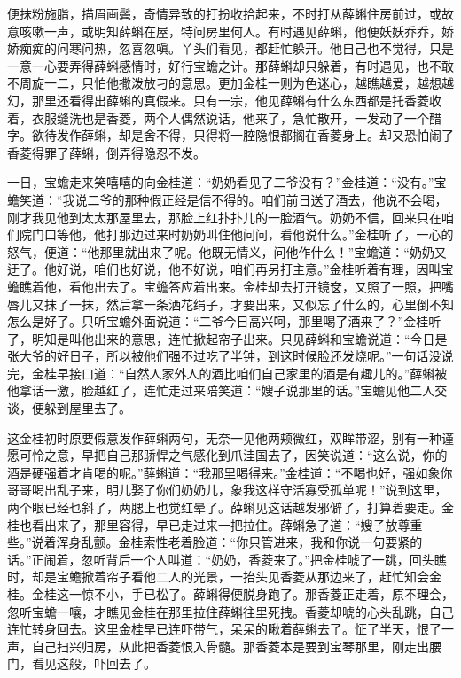 \begin{parag}
便抹粉施脂，描眉画鬓，奇情异致的打扮收拾起来，不时打从薛蝌住房前过，或故意咳嗽一声，或明知薛蝌在屋，特问房里何人。有时遇见薛蝌，他便妖妖乔乔，娇娇痴痴的问寒问热，忽喜忽嗔。丫头们看见，都赶忙躲开。他自己也不觉得，只是一意一心要弄得薛蝌感情时，好行宝蟾之计。那薛蝌却只躲着，有时遇见，也不敢不周旋一二，只怕他撒泼放刁的意思。更加金桂一则为色迷心，越瞧越爱，越想越幻，那里还看得出薛蝌的真假来。只有一宗，他见薛蝌有什么东西都是托香菱收着，衣服缝洗也是香菱，两个人偶然说话，他来了，急忙散开，一发动了一个醋字。欲待发作薛蝌，却是舍不得，只得将一腔隐恨都搁在香菱身上。却又恐怕闹了香菱得罪了薛蝌，倒弄得隐忍不发。
\end{parag}


\begin{parag}
    一日，宝蟾走来笑嘻嘻的向金桂道：“奶奶看见了二爷没有？”金桂道：“没有。”宝蟾笑道：“我说二爷的那种假正经是信不得的。咱们前日送了酒去，他说不会喝，刚才我见他到太太那屋里去，那脸上红扑扑儿的一脸酒气。奶奶不信，回来只在咱们院门口等他，他打那边过来时奶奶叫住他问问，看他说什么。”金桂听了，一心的怒气，便道：“他那里就出来了呢。他既无情义，问他作什么！”宝蟾道：“奶奶又迂了。他好说，咱们也好说，他不好说，咱们再另打主意。”金桂听着有理，因叫宝蟾瞧着他，看他出去了。宝蟾答应着出来。金桂却去打开镜奁，又照了一照，把嘴唇儿又抹了一抹，然后拿一条洒花绢子，才要出来，又似忘了什么的，心里倒不知怎么是好了。只听宝蟾外面说道：“二爷今日高兴呵，那里喝了酒来了？”金桂听了，明知是叫他出来的意思，连忙掀起帘子出来。只见薛蝌和宝蟾说道：“今日是张大爷的好日子，所以被他们强不过吃了半钟，到这时候脸还发烧呢。”一句话没说完，金桂早接口道：“自然人家外人的酒比咱们自己家里的酒是有趣儿的。”薛蝌被他拿话一激，脸越红了，连忙走过来陪笑道：“嫂子说那里的话。”宝蟾见他二人交谈，便躲到屋里去了。
\end{parag}


\begin{parag}
    这金桂初时原要假意发作薛蝌两句，无奈一见他两颊微红，双眸带涩，别有一种谨愿可怜之意，早把自己那骄悍之气感化到爪洼国去了，因笑说道：“这么说，你的酒是硬强着才肯喝的呢。”薛蝌道：“我那里喝得来。”金桂道：“不喝也好，强如象你哥哥喝出乱子来，明儿娶了你们奶奶儿，象我这样守活寡受孤单呢！”说到这里，两个眼已经乜斜了，两腮上也觉红晕了。薛蝌见这话越发邪僻了，打算着要走。金桂也看出来了，那里容得，早已走过来一把拉住。薛蝌急了道：“嫂子放尊重些。”说着浑身乱颤。金桂索性老着脸道：“你只管进来，我和你说一句要紧的话。”正闹着，忽听背后一个人叫道：“奶奶，香菱来了。”把金桂唬了一跳，回头瞧时，却是宝蟾掀着帘子看他二人的光景，一抬头见香菱从那边来了，赶忙知会金桂。金桂这一惊不小，手已松了。薛蝌得便脱身跑了。那香菱正走着，原不理会，忽听宝蟾一嚷，才瞧见金桂在那里拉住薛蝌往里死拽。香菱却唬的心头乱跳，自己连忙转身回去。这里金桂早已连吓带气，呆呆的瞅着薛蝌去了。怔了半天，恨了一声，自己扫兴归房，从此把香菱恨入骨髓。那香菱本是要到宝琴那里，刚走出腰门，看见这般，吓回去了。
\end{parag}


